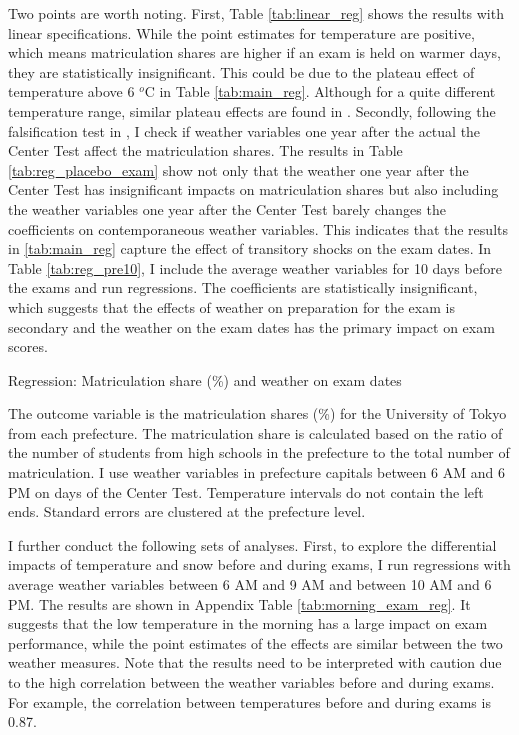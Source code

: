 \documentclass[12pt,letterpaper]{article}
\begin{document}
Two points are worth noting.
First, Table \ref{tab:linear_reg} shows the results with linear specifications.
While the point estimates for temperature are positive, which means matriculation shares are higher if an exam is held on warmer days, they are statistically insignificant. 
This could be due to the plateau effect of temperature above 6 $^o$C in Table \ref{tab:main_reg}.
Although for a quite different temperature range, similar plateau effects are found in \citet{Park2020a}.
Secondly, following the falsification test in \citet{Cho2017}, I check if weather variables one year after the actual the Center Test affect the matriculation shares.
The results in Table \ref{tab:reg_placebo_exam} show not only that the weather one year after the Center Test has insignificant impacts on matriculation shares but also including the weather variables one year after the Center Test barely changes the coefficients on contemporaneous weather variables.
This indicates that the results in \ref{tab:main_reg} capture the effect of transitory shocks on the exam dates.
In Table \ref{tab:reg_pre10}, I include the average weather variables for 10 days before the exams and run regressions.
The coefficients are statistically insignificant, which suggests that the effects of weather on preparation for the exam is secondary and the weather on the exam dates has the primary impact on exam scores.

\begin{table}[H]
  \center
  \caption{Regression: Matriculation share (\%) and weather on exam dates}
  \footnotesize
  
  \label{tab:main_reg}
  \small
  \begin{tablenotes}
    \item
      The outcome variable is the matriculation shares (\%) for the University of Tokyo from each prefecture.
      The matriculation share is calculated based on the ratio of the number of students from high schools in the prefecture to the total number of matriculation.
      I use weather variables in prefecture capitals between 6 AM and 6 PM on days of the Center Test.
      Temperature intervals do not contain the left ends.
      Standard errors are clustered at the prefecture level.
  \end{tablenotes}
\end{table}

I further conduct the following sets of analyses.
First, to explore the differential impacts of temperature and snow before and during exams, I run regressions with average weather variables between 6 AM and 9 AM and between 10 AM and 6 PM.
The results are shown in Appendix Table \ref{tab:morning_exam_reg}.
It suggests that the low temperature in the morning has a large impact on exam performance, while the point estimates of the effects are similar between the two weather measures.
Note that the results need to be interpreted with caution due to the high correlation between the weather variables before and during exams.
For example, the correlation between temperatures before and during exams is 0.87.
\end{document}
